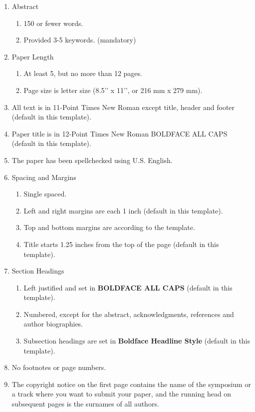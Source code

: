 \documentclass{scspaperproc}
\theoremstyle{scsthe}
\begin{document}
\begin{enumerate}
	\item Abstract
  \begin{enumerate}
	  \item 150 or fewer words.
	  \item Provided 3-5 keywords. (mandatory)
	\end{enumerate}
	\item Paper Length
  \begin{enumerate}
	  \item At least 5, but no more than 12 pages.
	  \item Page size is letter size (8.5’’ x 11’’, or 216 mm x 279 mm).
	\end{enumerate}
	\item All text is in 11-Point Times New Roman except title, header and footer (default in this template).
	\item Paper title is in 12-Point Times New Roman BOLDFACE ALL CAPS (default in this template).
	\item The paper has been spellchecked using U.S. English. 
	\item Spacing and Margins
  \begin{enumerate}
	  \item Single spaced.
	  \item Left and right margins are each 1 inch (default in this template).
	  \item Top and bottom margins are according to the template.
	  \item Title starts 1.25 inches from the top of the page (default in this template).
	\end{enumerate}
	\item Section Headings
  \begin{enumerate}
	  \item Left justified and set in \textbf{BOLDFACE ALL CAPS} (default in this template).
	  \item Numbered, except for the abstract, acknowledgments, references and author biographies.
	  \item Subsection headings are set in \textbf{Boldface Headline Style} (default in this template).
	\end{enumerate}
	\item No footnotes or page numbers.
	\item The copyright notice on the first page contains the name of the symposium or a track where you want to submit your paper, and the running head on subsequent pages is the surnames of all authors.

\end{enumerate}
\end{document}
